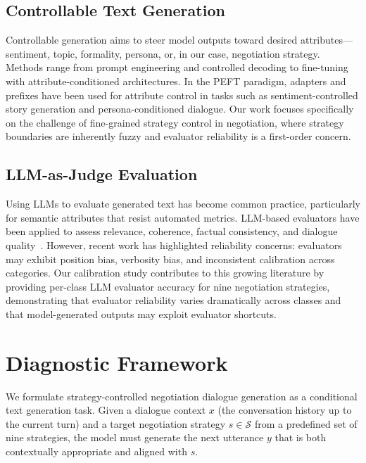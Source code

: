 \documentclass[conference]{IEEEtran}
\begin{document}
\subsection{Controllable Text Generation}

Controllable generation aims to steer model outputs toward desired attributes---sentiment, topic, formality, persona, or, in our case, negotiation strategy. Methods range from prompt engineering and controlled decoding to fine-tuning with attribute-conditioned architectures. In the PEFT paradigm, adapters and prefixes have been used for attribute control in tasks such as sentiment-controlled story generation and persona-conditioned dialogue. Our work focuses specifically on the challenge of fine-grained strategy control in negotiation, where strategy boundaries are inherently fuzzy and evaluator reliability is a first-order concern.

\subsection{LLM-as-Judge Evaluation}

Using LLMs to evaluate generated text has become common practice, particularly for semantic attributes that resist automated metrics. LLM-based evaluators have been applied to assess relevance, coherence, factual consistency, and dialogue quality~\cite{zheng2023judging}. However, recent work has highlighted reliability concerns: evaluators may exhibit position bias, verbosity bias, and inconsistent calibration across categories. Our calibration study contributes to this growing literature by providing per-class LLM evaluator accuracy for nine negotiation strategies, demonstrating that evaluator reliability varies dramatically across classes and that model-generated outputs may exploit evaluator shortcuts.

\section{Diagnostic Framework}

We formulate strategy-controlled negotiation dialogue generation as a conditional text generation task. Given a dialogue context $x$ (the conversation history up to the current turn) and a target negotiation strategy $s \in \mathcal{S}$ from a predefined set of nine strategies, the model must generate the next utterance $y$ that is both contextually appropriate and aligned with $s$.
\end{document}
